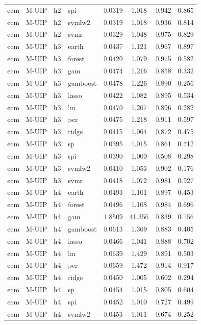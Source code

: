 \begin{ThreePartTable}
\begin{longtable}[t]{llclcccc}
ecm & M-UIP & h2 & spi & 0.0319 & 1.018 & 0.942 & 0.865\\
ecm & M-UIP & h2 & svmlw2 & 0.0319 & 1.018 & 0.936 & 0.814\\
ecm & M-UIP & h2 & svmr & 0.0329 & 1.048 & 0.975 & 0.829\\
\addlinespace
ecm & M-UIP & h3 & earth & 0.0437 & 1.121 & 0.967 & 0.897\\
ecm & M-UIP & h3 & forest & 0.0420 & 1.079 & 0.975 & 0.582\\
ecm & M-UIP & h3 & gam & 0.0474 & 1.216 & 0.858 & 0.332\\
ecm & M-UIP & h3 & gamboost & 0.0478 & 1.226 & 0.890 & 0.256\\
ecm & M-UIP & h3 & lasso & 0.0422 & 1.082 & 0.895 & 0.534\\
ecm & M-UIP & h3 & lm & 0.0470 & 1.207 & 0.896 & 0.282\\
ecm & M-UIP & h3 & pcr & 0.0475 & 1.218 & 0.911 & 0.597\\
ecm & M-UIP & h3 & ridge & 0.0415 & 1.064 & 0.872 & 0.475\\
ecm & M-UIP & h3 & sp & 0.0395 & 1.015 & 0.861 & 0.712\\
ecm & M-UIP & h3 & spi & 0.0390 & 1.000 & 0.508 & 0.298\\
ecm & M-UIP & h3 & svmlw2 & 0.0410 & 1.053 & 0.902 & 0.176\\
ecm & M-UIP & h3 & svmr & 0.0418 & 1.072 & 0.981 & 0.927\\
\addlinespace
ecm & M-UIP & h4 & earth & 0.0493 & 1.101 & 0.897 & 0.453\\
ecm & M-UIP & h4 & forest & 0.0496 & 1.108 & 0.984 & 0.696\\
ecm & M-UIP & h4 & gam & 1.8509 & 41.356 & 0.839 & 0.156\\
ecm & M-UIP & h4 & gamboost & 0.0613 & 1.369 & 0.883 & 0.405\\
ecm & M-UIP & h4 & lasso & 0.0466 & 1.041 & 0.888 & 0.702\\
ecm & M-UIP & h4 & lm & 0.0639 & 1.429 & 0.891 & 0.503\\
ecm & M-UIP & h4 & pcr & 0.0659 & 1.472 & 0.914 & 0.917\\
ecm & M-UIP & h4 & ridge & 0.0450 & 1.005 & 0.602 & 0.294\\
ecm & M-UIP & h4 & sp & 0.0454 & 1.015 & 0.805 & 0.604\\
ecm & M-UIP & h4 & spi & 0.0452 & 1.010 & 0.727 & 0.499\\
ecm & M-UIP & h4 & svmlw2 & 0.0453 & 1.011 & 0.674 & 0.252\\

\end{longtable}
\end{ThreePartTable}
